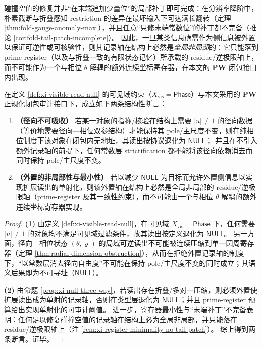 \begin{remark}\label{rem:xi-register-minimality-no-tail-patch}
碰撞空值的修复并非“在末端追加少量位”的局部补丁即可完成：在分辨率降阶中，朴素截断与折叠感知 restriction 的差异在最坏输入下可达满长翻转（定理 \ref{thm:fold-gauge-anomaly-max}），并且任意“只修末端常数位”的补丁都不完备（推论 \ref{cor:fold-tail-patch-incomplete}）。
因此，一旦某类信息确需作为侧信息被外置以保证可逆性或可核验性，则其记录轴在结构上必然是\emph{全局非局部}的：它只能落到 prime-register（以及与折叠一致的有限状态记忆）所承载的 residue/逆极限轴上，而不可能作为一个与相位 \(\theta\) 解耦的额外连续坐标寄存器，在本文的 \(\mathbf{PW}\) 闭包接口内出现。
\end{remark}

\begin{theorem}\label{thm:xi-pw-no-continuous-hair}
在定义 \ref{def:xi-visible-read-null} 的可见域约束（\(X_{\mathrm{vis}}=\mathsf{Phase}\)）与本文采用的 \(\mathbf{PW}\) 正规化闭包审计接口下，成立如下两条结构性断言：
\begin{enumerate}
  \item \textbf{（径向不可吸收）}
  若某一对象的指称/核验在结构上需要 \(|u|\neq 1\) 的径向数据（等价地需要径向—相位双参结构）才能保持其 pole/主尺度不变，则在纯相位制度下该对象在闭包内无地址，其读出按协议退化为 \(\mathsf{NULL}\)；
  并且在不引入额外记录轴的前提下，任何常数层 strictification 都不能将该径向依赖消去而同时保持 pole/主尺度不变。
  \item \textbf{（外置的非局部性与最小性）}
  若以减少 \(\mathsf{NULL}\) 为目标而允许外置侧信息以实现扩展读出的单射化，则该外置轴在结构上必然是全局非局部的 residue/逆极限轴（prime-register 及其一致性约束），而不可能由一个与相位 \(\theta\) 解耦的额外连续坐标寄存器实现。
\end{enumerate}
\end{theorem}

\begin{proof}
\textbf{(1)} 由定义 \ref{def:xi-visible-read-null}，在可见域 \(X_{\mathrm{vis}}=\mathsf{Phase}\) 下，任何需要 \(|u|\neq 1\) 的对象均不满足可见域过滤条件，故其读出按定义退化为 \(\mathsf{NULL}\)。
另一方面，径向—相位状态 \((\theta,\varrho)\) 的局域可逆读出不可能被连续压缩到单一圆周寄存器（定理 \ref{thm:radial-dimension-obstruction}），从而在拒绝外置记录轴的制度下，“以常数层消去径向自由度”不可能在保持 pole/主尺度不变的同时成立；其语义后果即为不可寻址（\(\mathsf{NULL}\)）。
\par
\textbf{(2)} 由命题 \ref{prop:xi-null-three-way}，若读出存在折叠/多对一压缩，则必须外置使扩展读出成为单射的记录轴，否则在类型层退化为 \(\mathsf{NULL}\)；并且 prime-register 预算给出实现单射化的可审计阈值。
进一步，寄存器最小性与“末端补丁”不完备表明：任何足以修复碰撞空值的记录轴在结构上必为全局非局部，并只能落在 residue/逆极限轴上（注 \ref{rem:xi-register-minimality-no-tail-patch}）。
综上得到两条断言。证毕。
\end{proof}

